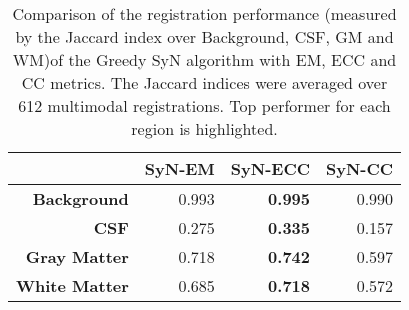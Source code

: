 \begin{table}[htbp]
  \centering
  {\small
    \begin{tabular}{rrrr}
    \toprule
          & \textbf{SyN-EM} & \textbf{SyN-ECC} & \textbf{SyN-CC} \\
    \midrule
    \textbf{Background} & 0.993 & \textbf{0.995} & 0.990 \\
    \textbf{CSF} & 0.275 & \textbf{0.335} & 0.157 \\
    \textbf{Gray Matter} & 0.718 & \textbf{0.742} & 0.597 \\
    \textbf{White Matter} & 0.685 & \textbf{0.718} & 0.572 \\
    \bottomrule
    \end{tabular}}%
  \caption{Comparison of the registration performance (measured by the Jaccard index over Background, CSF, GM and WM)of the Greedy SyN algorithm with EM, ECC and CC metrics. The Jaccard
indices were averaged over 612 multimodal registrations. Top performer for each region is highlighted.}
  \label{tab:multimodal_results_segTri_fill}%
\end{table}%
